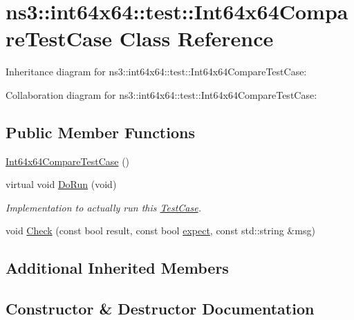 \hypertarget{classns3_1_1int64x64_1_1test_1_1Int64x64CompareTestCase}{}\section{ns3\+:\+:int64x64\+:\+:test\+:\+:Int64x64\+Compare\+Test\+Case Class Reference}
\label{classns3_1_1int64x64_1_1test_1_1Int64x64CompareTestCase}


Inheritance diagram for ns3\+:\+:int64x64\+:\+:test\+:\+:Int64x64\+Compare\+Test\+Case\+:


Collaboration diagram for ns3\+:\+:int64x64\+:\+:test\+:\+:Int64x64\+Compare\+Test\+Case\+:
\subsection*{Public Member Functions}
\begin{DoxyCompactItemize}
\item 
\hyperlink{classns3_1_1int64x64_1_1test_1_1Int64x64CompareTestCase_af048d9f3494cd4dd4dc6e1cc1805a823}{Int64x64\+Compare\+Test\+Case} ()
\item 
virtual void \hyperlink{classns3_1_1int64x64_1_1test_1_1Int64x64CompareTestCase_ae647f046eb96ce2cf99b235b0620b676}{Do\+Run} (void)
\begin{DoxyCompactList}\small\item\em Implementation to actually run this \hyperlink{classns3_1_1TestCase}{Test\+Case}. \end{DoxyCompactList}\item 
void \hyperlink{classns3_1_1int64x64_1_1test_1_1Int64x64CompareTestCase_adde7573d4b2bbb64e0cc93c09ca24840}{Check} (const bool result, const bool \hyperlink{doc_2readme_8txt_a11460adc33d00ccf94a559cdd45990ea}{expect}, const std\+::string \&msg)
\end{DoxyCompactItemize}
\subsection*{Additional Inherited Members}


\subsection{Constructor \& Destructor Documentation}

